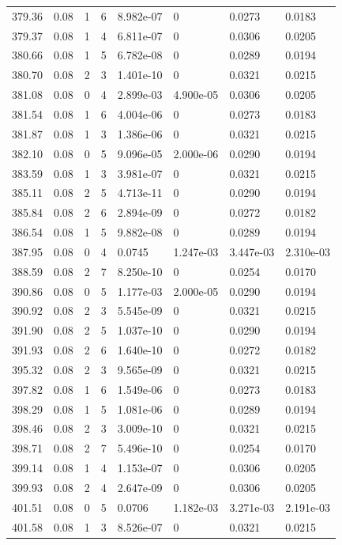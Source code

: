 \documentclass[preview]{standalone}
\begin{document}
{{{{{{{{{{\begin{tabular}{L{1.2cm}C{1.2cm} C{0.3cm}C{0.5cm} C{1.4cm}C{1.4cm} C{1.4cm}C{1.4cm}}
  379.36  &  0.08  & 1     &  6 &  8.982e-07  & 0  & 0.0273 &  0.0183   \\ 
  379.37  &  0.08  & 1     &  4 &  6.811e-07  & 0  & 0.0306 &  0.0205   \\ 
  380.66  &  0.08  & 1     &  5 &  6.782e-08  & 0  & 0.0289 &  0.0194   \\ 
  380.70  &  0.08  & 2     &  3 &  1.401e-10  & 0  & 0.0321 &  0.0215   \\ 
  381.08  &  0.08  & 0     &  4 &  2.899e-03  & 4.900e-05  & 0.0306 &  0.0205   \\ 
  381.54  &  0.08  & 1     &  6 &  4.004e-06  & 0  & 0.0273 &  0.0183   \\ 
  381.87  &  0.08  & 1     &  3 &  1.386e-06  & 0  & 0.0321 &  0.0215   \\ 
  382.10  &  0.08  & 0     &  5 &  9.096e-05  & 2.000e-06  & 0.0290 &  0.0194   \\ 
  383.59  &  0.08  & 1     &  3 &  3.981e-07  & 0  & 0.0321 &  0.0215   \\ 
  385.11  &  0.08  & 2     &  5 &  4.713e-11  & 0  & 0.0290 &  0.0194   \\ 
  385.84  &  0.08  & 2     &  6 &  2.894e-09  & 0  & 0.0272 &  0.0182   \\ 
  386.54  &  0.08  & 1     &  5 &  9.882e-08  & 0  & 0.0289 &  0.0194   \\ 
  387.95  &  0.08  & 0     &  4 &  0.0745  & 1.247e-03  & 3.447e-03 &  2.310e-03   \\ 
  388.59  &  0.08  & 2     &  7 &  8.250e-10  & 0  & 0.0254 &  0.0170   \\ 
  390.86  &  0.08  & 0     &  5 &  1.177e-03  & 2.000e-05  & 0.0290 &  0.0194   \\ 
  390.92  &  0.08  & 2     &  3 &  5.545e-09  & 0  & 0.0321 &  0.0215   \\ 
  391.90  &  0.08  & 2     &  5 &  1.037e-10  & 0  & 0.0290 &  0.0194   \\ 
  391.93  &  0.08  & 2     &  6 &  1.640e-10  & 0  & 0.0272 &  0.0182   \\ 
  395.32  &  0.08  & 2     &  3 &  9.565e-09  & 0  & 0.0321 &  0.0215   \\ 
  397.82  &  0.08  & 1     &  6 &  1.549e-06  & 0  & 0.0273 &  0.0183   \\ 
  398.29  &  0.08  & 1     &  5 &  1.081e-06  & 0  & 0.0289 &  0.0194   \\ 
  398.46  &  0.08  & 2     &  3 &  3.009e-10  & 0  & 0.0321 &  0.0215   \\ 
  398.71  &  0.08  & 2     &  7 &  5.496e-10  & 0  & 0.0254 &  0.0170   \\ 
  399.14  &  0.08  & 1     &  4 &  1.153e-07  & 0  & 0.0306 &  0.0205   \\ 
  399.93  &  0.08  & 2     &  4 &  2.647e-09  & 0  & 0.0306 &  0.0205   \\ 
  401.51  &  0.08  & 0     &  5 &  0.0706  & 1.182e-03  & 3.271e-03 &  2.191e-03   \\ 
  401.58  &  0.08  & 1     &  3 &  8.526e-07  & 0  & 0.0321 &  0.0215   \\ 
\hline 
\end{tabular} 

}}}}}}}}}}
\end{document}
